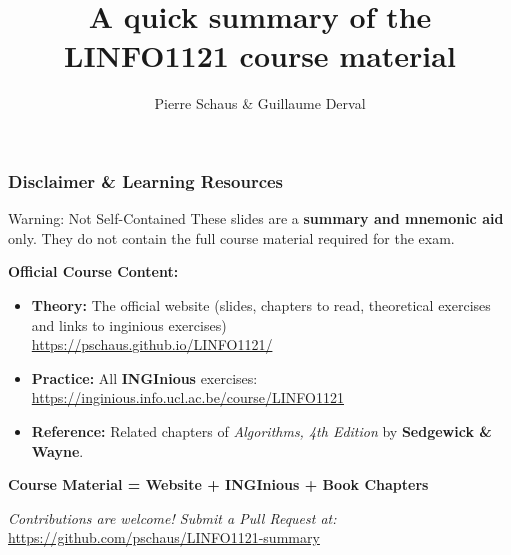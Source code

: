 \documentclass[8pt,aspectratio=169]{beamer}
\begin{document}
	\author{Pierre Schaus \& Guillaume Derval}
	\title{A quick summary of the LINFO1121 course material}

	\begin{frame}[plain]
	\maketitle
	\end{frame}

\begin{frame}[t]
\frametitle{Disclaimer \& Learning Resources}

\begin{alertblock}{Warning: Not Self-Contained}
These slides are a \textbf{summary and mnemonic aid} only. They do not contain the full course material required for the exam.
\end{alertblock}

\vspace{0.3cm}
\textbf{Official Course Content:}
\begin{itemize}
    \item \textbf{Theory:} The official website (slides, chapters to read, theoretical exercises and links to inginious exercises)\\ 
    \small \url{https://pschaus.github.io/LINFO1121/}
    \item \textbf{Practice:} All \textbf{INGInious} exercises:\\
    \small \url{https://inginious.info.ucl.ac.be/course/LINFO1121}
    \item \textbf{Reference:} Related chapters of \textit{Algorithms, 4th Edition} by \textbf{Sedgewick \& Wayne}.
\end{itemize}

\vspace{0.4cm}
\begin{center}
    \color{red} \textbf{Course Material = Website + INGInious + Book Chapters}
\end{center}

\vspace{0.2cm}
\footnotesize \textit{Contributions are welcome! Submit a Pull Request at:} \\
\url{https://github.com/pschaus/LINFO1121-summary}

\end{frame}
\end{document}
